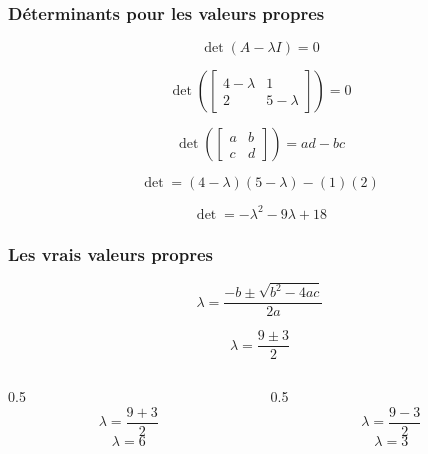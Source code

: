 \begin{frame}
    \frametitle{Déterminants pour les valeurs propres}
    \begin{equation}
        \det(A-\lambda I)=0
    \end{equation}

    \begin{equation}
        \det\left(
        \begin{bmatrix}
            4-\lambda&1\\
            2&5-\lambda
        \end{bmatrix}
        \right)=0
    \end{equation}

    \begin{equation}
        \det\left(
            \begin{bmatrix}
                a&b\\
                c&d
            \end{bmatrix}
        \right)
        =
        ad-bc
    \end{equation}

    \begin{equation}
        \det=(4-\lambda)(5-\lambda)-(1)(2)
    \end{equation}

    \begin{equation}
        \det=-\lambda^2-9\lambda+18
    \end{equation}
\end{frame}


\begin{frame}
    \frametitle{Les vrais valeurs propres}
    \begin{equation}
        \lambda=\frac{-b\pm\sqrt{b^2-4ac}}{2a}
    \end{equation}

    \begin{equation}
        \lambda=\frac{9\pm3}{2}
    \end{equation}

    \vspace{1cm}

    \begin{columns}
		\begin{column}{0.5\textwidth}
			\centering
			\begin{equation}
                \lambda=\frac{9+3}{2}
            \end{equation}
            \begin{equation}
                \lambda=6
            \end{equation}
		\end{column}
		\begin{column}{0.5\textwidth}
			\centering
			\begin{equation}
                \lambda=\frac{9-3}{2}
            \end{equation}
            \begin{equation}
                \lambda=3
            \end{equation}
		\end{column}
	\end{columns}
\end{frame}



